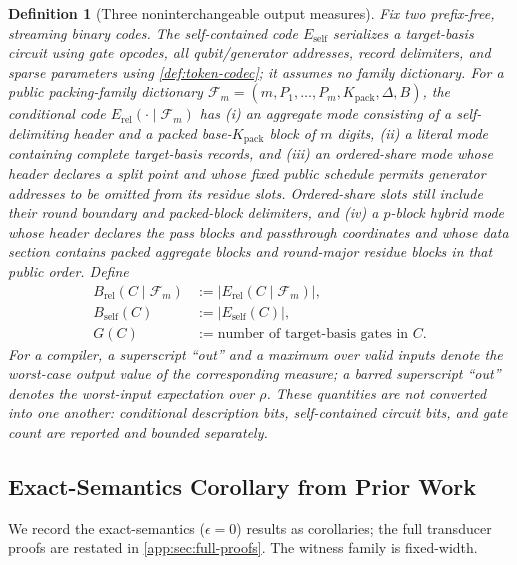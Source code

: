 \documentclass[aps,prx,reprint,floatfix,superscriptaddress]{revtex4-2}
\newtheorem{definition}{Definition}
\begin{document}
\begin{definition}[Three noninterchangeable output measures]
\label{def:info-budget-bits}
Fix two prefix-free, streaming binary codes.  The self-contained code
$E_{\mathrm{self}}$ serializes a target-basis circuit using gate opcodes,
all qubit/generator addresses, record delimiters, and sparse parameters
using \cref{def:token-codec}; it assumes no family dictionary.  For a public
packing-family dictionary
$\mathcal F_m=(m,P_1,\ldots,P_m,K_{\mathrm{pack}},\Delta,B)$, the conditional code
$E_{\mathrm{rel}}(\cdot\mid\mathcal F_m)$ has (i) an aggregate mode
consisting of a self-delimiting header and a packed
base-$K_{\mathrm{pack}}$ block of $m$
digits, (ii) a literal mode containing complete target-basis records, and
    (iii) an ordered-share mode whose header declares a split point and whose
fixed public schedule permits generator addresses to be omitted from its
residue slots.  Ordered-share slots still include their round boundary and
packed-block delimiters, and (iv) a $p$-block hybrid mode whose header
declares the pass blocks and passthrough coordinates and whose data section
contains packed aggregate blocks and round-major residue blocks in that
public order.  Define
\begin{equation}\label{eq:Bout-def}
\begin{aligned}
 B_{\mathrm{rel}}(C\mid\mathcal F_m)
 &:=|E_{\mathrm{rel}}(C\mid\mathcal F_m)|,\\
 B_{\mathrm{self}}(C)&:=|E_{\mathrm{self}}(C)|,\\
 G(C)&:=\text{number of target-basis gates in }C.
\end{aligned}
\end{equation}
For a compiler, a superscript ``out'' and a maximum over valid inputs denote
the worst-case output value of the corresponding measure; a barred
superscript ``out'' denotes the worst-input expectation over $\rho$.  These quantities
are not converted into one another: conditional description bits,
self-contained circuit bits, and gate count are reported and bounded
separately.
\end{definition}



\subsection{Exact-Semantics Corollary from Prior Work}

We record the exact-semantics ($\epsilon = 0$) results
as corollaries; the full transducer proofs are
restated in \cref{app:sec:full-proofs}. The witness family is
fixed-width.
\end{document}
